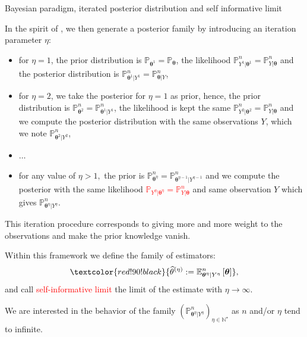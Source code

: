 \documentclass[final,hyperref={pdfpagelabels=false}]{beamer}
\begin{document}
\begin{frame}[t]
\begin{columns}[t]
\begin{column}{.30\textwidth}
\begin{block}{\rule{0pt}{2.5ex} Bayesian paradigm, iterated posterior distribution and self informative limit}
\bigskip

In the spirit of \citet{OBJJ}, we then generate a posterior family by introducing an \textcolor{red!90!black}{iteration parameter $\eta$}:
\begin{itemize}
\item for $\eta = 1$, the prior distribution is $\mathbb{P}_{\boldsymbol{\theta}^{1}} = \mathbb{P}_{\boldsymbol{\theta}}$, the likelihood $\mathbb{P}_{Y^{1} \vert \boldsymbol{\theta}^{1}}^{n} = \mathbb{P}_{Y \vert \boldsymbol{\theta}}^{n}$ and the posterior distribution is $\mathbb{P}_{\boldsymbol{\theta}^{1}\vert Y^{1}}^{n} =\mathbb{P}_{\boldsymbol{\theta}\vert Y}^{n}$,
\item for $\eta = 2$, we take the posterior for $\eta = 1$ as prior, hence, the prior distribution is $ \mathbb{P}_{\boldsymbol{\theta}^{2}}^{n} = \mathbb{P}_{\boldsymbol{\theta}^{1}\vert Y^{1}}^{n}$, the likelihood is kept the same $\mathbb{P}_{Y^{2} \vert \boldsymbol{\theta}^{2}}^{n} = \mathbb{P}_{Y \vert \boldsymbol{\theta}}^{n}$ and we compute the posterior distribution with the same observations $Y$, which we note $\mathbb{P}_{\boldsymbol{\theta}^{2}\vert Y^{2}}^{n}$,
\item $\hdots$
\item for any value of $\eta > 1,$ the prior is \textcolor{red!90!black}{$ \mathbb{P}_{\boldsymbol{\theta}^{\eta}}^{n} = \mathbb{P}_{\boldsymbol{\theta}^{\eta - 1} \vert Y^{\eta - 1}}^{n}$} and we compute the posterior with the same likelihood \textcolor{red}{$\mathbb{P}_{Y^{\eta} \vert \boldsymbol{\theta}^{\eta}} = \mathbb{P}_{Y \vert \boldsymbol{\theta}}^{n}$} and same observation $Y$ which gives \textcolor{red!90!black}{$\mathbb{P}_{\boldsymbol{\theta}^{\eta} \vert Y^{\eta}}^{n}$}.
\end{itemize}

This iteration procedure corresponds to giving more and more weight to the observations and make the prior knowledge vanish.

\medskip

Within this framework we define the family of estimators:
\[\textcolor{red!90!black}{\widehat{\theta}^{\left(\eta\right)} := \mathbb{E}_{\boldsymbol{\theta}^{\eta}\vert Y^{\eta}}^{n}\left[\boldsymbol{\theta}\right]},\]
and call \textcolor{red}{self-informative limit} the limit of the estimate with $\eta \rightarrow \infty.$

\medskip

We are interested in the behavior of the family $\left(\mathbb{P}_{\boldsymbol{\theta}^{\eta}\vert Y^{\eta}}^{n}\right)_{\eta \in \mathbb{N}^{\star}}$ as $n$ and/or $\eta$ tend to infinite.


\end{block}
\end{column}
\end{columns}
\end{frame}
\end{document}

